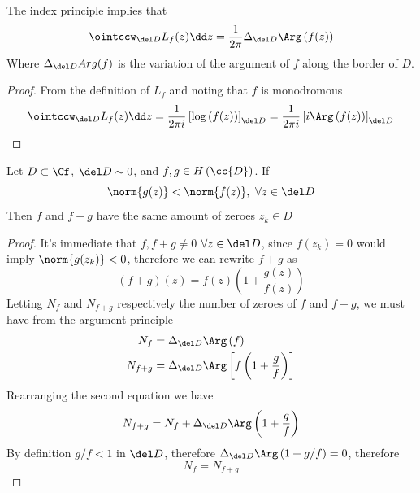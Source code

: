 \documentclass[../mmf.tex]{subfiles}
\begin{document}
\begin{thm}
	The index principle implies that
	\begin{equation}
		\ointccw_{\del D}L_{f}(z)\dd z=\frac{1}{2\pi}\Delta_{\del D}\Arg\left( f(z) \right)
		\label{eq:argprinc}
	\end{equation}
	Where $\Delta_{\del D}Arg(f)$ is the variation of the argument of $f$ along the border of $D$.
\end{thm}
\begin{proof}
	From the definition of $L_{f}$ and noting that $f$ is monodromous
	\begin{equation*}
		\ointccw_{\del D}L_{f}(z)\dd z =\frac{1}{2\pi i}\left[ \log\left( f(z) \right) \right]_{\del D}=\frac{1}{2\pi i}\left[ i\Arg\left( f(z) \right) \right]_{\del D}
	\end{equation*}
\end{proof}
\begin{thm}[Rouché]
	Let $D\subset\Cf$, $\del D\sim0$, and $f, g\in H\left( \cc{D} \right)$. If
	\begin{equation*}
		\norm{g(z)}<\norm{f(z)}, \ \forall z\in\del D
	\end{equation*}
	Then $f$ and $f+g$ have the same amount of zeroes $z_k\in D$
\end{thm}
\begin{proof}
	It's immediate that $f, f+g\ne0$ $\forall z\in\del D$, since $f(z_k)=0$ would imply $\norm{g(z_k)}<0$, therefore we can rewrite $f+g$ as
	\begin{equation*}
		\left( f+g \right)(z)=f(z)\left( 1+\frac{g(z)}{f(z)} \right)
	\end{equation*}
	Letting $N_f$ and $N_{f+g}$ respectively the number of zeroes of $f$ and $f+g$, we must have from the argument principle
	\begin{equation*}
		\begin{aligned}
			N_f&= \Delta_{\del D}\Arg\left( f \right)\\
			N_{f+g}&= \Delta_{\del D}\Arg\left[ f\left( 1+\frac{g}{f} \right) \right]
		\end{aligned}
	\end{equation*}
	Rearranging the second equation we have
	\begin{equation*}
		N_{f+g}=N_{f}+\Delta_{\del D}\Arg\left( 1+\frac{g}{f} \right)
	\end{equation*}
	By definition $g/f<1$ in $\del D$, therefore $\Delta_{\del D}\Arg\left( 1+g/f \right)=0$, therefore
	\begin{equation*}
		N_{f}=N_{f+g}
	\end{equation*}
\end{proof}
\end{document}
